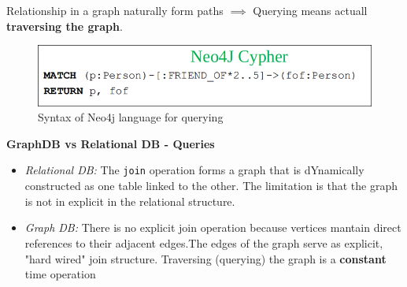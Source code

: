 Relationship in a graph naturally form paths $\implies$ Querying means actuall \textbf{traversing the graph}. 

\begin{figure}[htbp]
  \centering
  \includegraphics[scale = 0.5]{Attachments/image copy 3.png}
  \caption*{Syntax of Neo4j language for querying}
\end{figure}

\textbf{GraphDB vs Relational DB - Queries}
\begin{itemize}
    \item \textit{Relational DB:} The \texttt{join} operation forms a graph that is dYnamically constructed as one table linked to the other. The limitation is that the graph is not in explicit in the relational structure. 
    \item \textit{Graph DB:} There is no explicit join operation because vertices mantain direct references to their adjacent edges.The edges of the graph serve as explicit, "hard wired" join structure. Traversing (querying) the graph is a \textbf{constant} time operation 
\end{itemize}

